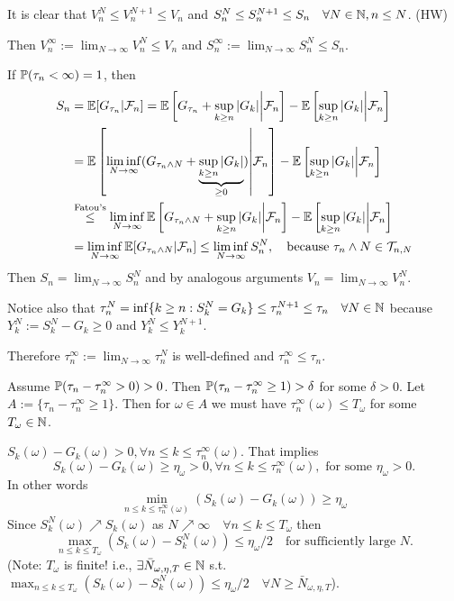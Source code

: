 \begin{remark}
    It is clear that $V_n^N \le V_n^{N+1} \le V_n$ and $S_n^N \le S_n^{N+1} \le S_n \quad \forall N \in \mathbb N, n \le N$. (HW)
    
    Then $V_n^\infty := \lim_{N \to \infty} V_n^N \le V_n$ and $S_n^\infty := \lim_{N \to \infty} S_n^N \le S_n$.

    If $\mathbb P(\tau_n < \infty) = 1$, then
    \begin{align*}
        S_n &= \mathbb E[G_{\tau_n} | \mathcal{F}_n] = \mathbb E\left[ G_{\tau_n} + \sup_{k \ge n} |G_k| \middle| \mathcal{F}_n \right] - \mathbb E\left[ \sup_{k \ge n} |G_k| \middle| \mathcal{F}_n \right] \\
        &= \mathbb E\left[ \liminf_{N \to \infty} (G_{\tau_n \wedge N} + \underbrace{\sup_{k \ge n} |G_k|}_{\ge 0}) \middle| \mathcal{F}_n \right] - \mathbb E\left[ \sup_{k \ge n} |G_k| \middle| \mathcal{F}_n \right] \\
        &\overset{\text{Fatou's}}{\le} \liminf_{N \to \infty} \mathbb E\left[ G_{\tau_n \wedge N} + \sup_{k \ge n} |G_k| \middle| \mathcal{F}_n \right] - \mathbb E\left[ \sup_{k \ge n} |G_k| \middle| \mathcal{F}_n \right] \\
        &= \liminf_{N \to \infty} \mathbb E[G_{\tau_n \wedge N} | \mathcal{F}_n] \le \liminf_{N \to \infty} S_n^N, \quad \text{because } \tau_n \wedge N \in \mathcal{T}_{n,N}
    \end{align*}
    Then $S_n = \lim_{N \to \infty} S_n^N$ and by analogous arguments $V_n = \lim_{N \to \infty} V_n^N$.

    Notice also that $\tau_n^N = \inf \{k \ge n : S_k^N = G_k\} \le \tau_n^{N+1} \le \tau_n \quad \forall N \in \mathbb N$ because $Y_k^N := S_k^N - G_k \ge 0$ and $Y_k^N \le Y_k^{N+1}$.

    Therefore $\tau_n^\infty := \lim_{N \to \infty} \tau_n^N$ is well-defined and $\tau_n^\infty \le \tau_n$.

    Assume $\mathbb P(\tau_n - \tau_n^\infty > 0) > 0$. Then $\mathbb P(\tau_n - \tau_n^\infty \ge 1) > \delta$ for some $\delta > 0$. Let $A := \{\tau_n - \tau_n^\infty \ge 1\}$. Then for $\omega \in A$ we must have $\tau_n^\infty(\omega) \le T_\omega$ for some $T_\omega \in \mathbb N$.
    
    $S_k(\omega) - G_k(\omega) > 0, \forall n \le k \le \tau_n^\infty(\omega)$. That implies
    $$S_k(\omega) - G_k(\omega) \ge \eta_\omega > 0, \forall n \le k \le \tau_n^\infty(\omega), \text{ for some } \eta_\omega > 0.$$
    In other words
    \begin{equation} \label{eq:min_diff}
        \min_{n \le k \le \tau_n^\infty(\omega)} (S_k(\omega) - G_k(\omega)) \ge \eta_\omega \tag{1}
    \end{equation}
    Since $S_k^N(\omega) \nearrow S_k(\omega)$ as $N \nearrow \infty \quad \forall n \le k \le T_\omega$ then
    $$\max_{n \le k \le T_\omega} (S_k(\omega) - S_k^N(\omega)) \le \eta_\omega / 2 \quad \text{for sufficiently large } N.$$
    (Note: $T_\omega$ is finite! i.e., $\exists \bar{N}_{\omega, \eta, T} \in \mathbb N$ s.t. $\max_{n \le k \le T_\omega} (S_k(\omega) - S_k^N(\omega)) \le \eta_\omega / 2 \quad \forall N \ge \bar{N}_{\omega, \eta, T}$).


\end{remark}
